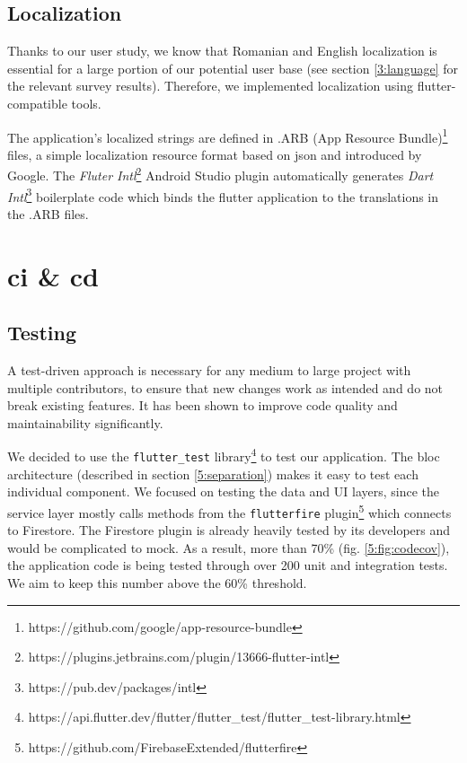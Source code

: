 \subsection{Localization} \label{5:localization}
Thanks to our user study, we know that Romanian and English localization is essential for a large portion of our potential user base (see section \ref{3:language} for the relevant survey results). Therefore, we implemented localization using \gls{flutter}-compatible tools.

The application's localized strings are defined in .ARB (App Resource Bundle)\footnote{https://github.com/google/app-resource-bundle} files, a simple localization resource format based on \gls{json} and introduced by Google. The \textit{Fluter Intl}\footnote{https://plugins.jetbrains.com/plugin/13666-flutter-intl} Android Studio plugin automatically generates \textit{Dart Intl}\footnote{https://pub.dev/packages/intl} boilerplate code which binds the \gls{flutter} application to the translations in the .ARB files.

\section{\acrshort{ci} \& \acrshort{cd}} \label{5:cicd}

\subsection{Testing} \label{5:cicd_testing}

A test-driven approach is necessary for any medium to large project with multiple contributors, to ensure that new changes work as intended and do not break existing features. It has been shown\cite{hilton2009quantitatively} to improve code quality and maintainability significantly.

We decided to use the \texttt{flutter_test} library\footnote{https://api.flutter.dev/flutter/flutter\_test/flutter\_test-library.html} to test our application. The \gls{bloc} architecture (described in section \ref{5:separation}) makes it easy to test each individual component. We focused on testing the data and UI layers, since the service layer mostly calls methods from the \texttt{flutterfire} plugin\footnote{https://github.com/FirebaseExtended/flutterfire} which connects to Firestore. The Firestore plugin is already heavily tested by its developers and would be complicated to mock. As a result, more than 70\% (fig. \ref{5:fig:codecov}), the application code is being tested through over 200 unit and integration tests. We aim to keep this number above the 60\% threshold.

